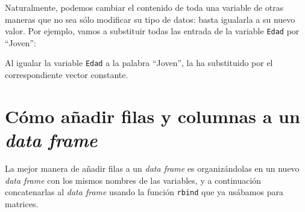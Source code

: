 \documentclass[
]{book}
\newenvironment{Shaded}{\begin{snugshade}}{\end{snugshade}}
\newcommand{\CommentTok}[1]{\textcolor[rgb]{0.56,0.35,0.01}{\textit{#1}}}
\newcommand{\NormalTok}[1]{#1}
\newcommand{\OperatorTok}[1]{\textcolor[rgb]{0.81,0.36,0.00}{\textbf{#1}}}
\newcommand{\StringTok}[1]{\textcolor[rgb]{0.31,0.60,0.02}{#1}}
\theoremstyle{definition}
\theoremstyle{definition}
\theoremstyle{definition}
\theoremstyle{remark}
\begin{document}
Naturalmente, podemos cambiar el contenido de toda una variable de otras maneras que no sea sólo modificar su tipo de datos: basta igualarla a su nuevo valor. Por ejemplo, vamos a substituir todas las entrada de la variable \texttt{Edad} por ``Joven'':

\begin{Shaded}
\end{Shaded}

Al igualar la variable \texttt{Edad} a la palabra ``Joven'', la ha substituido por el correspondiente vector constante.

\hypertarget{sec:dfaf}{%
\section{\texorpdfstring{Cómo añadir filas y columnas a un \emph{data frame}}{Cómo añadir filas y columnas a un data frame}}\label{sec:dfaf}}

La mejor manera de añadir filas a un \emph{data frame} es organizándolas en un nuevo \emph{data frame} con los mismos nombres de las variables, y a continuación concatenarlas al \emph{data frame} usando la función \texttt{rbind} que ya usábamos para matrices.
\end{document}
